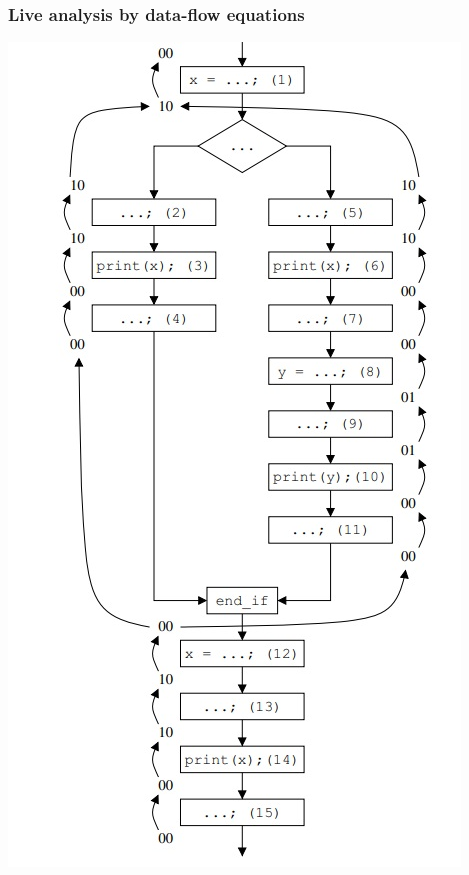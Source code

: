 \documentclass[presentation]{beamer}
\begin{document}
\begin{frame}
  \frametitle{Live analysis by data-flow equations}
  \begin{center}
      \includegraphics[scale=0.45]{525.jpg}
  \end{center}
\end{frame}
\end{document}
